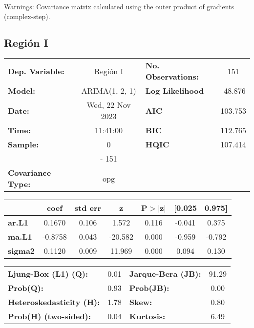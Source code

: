 \documentclass{article}%
\begin{document}
Warnings: \newline
 [1] Covariance matrix calculated using the outer product of gradients (complex-step).%
\subsection*{Región I}%
\begin{center}
\begin{tabular}{lclc}
\toprule
\textbf{Dep. Variable:}          &     Región I     & \textbf{  No. Observations:  } &    151      \\
\textbf{Model:}                  &  ARIMA(1, 2, 1)  & \textbf{  Log Likelihood     } &  -48.876    \\
\textbf{Date:}                   & Wed, 22 Nov 2023 & \textbf{  AIC                } &  103.753    \\
\textbf{Time:}                   &     11:41:00     & \textbf{  BIC                } &  112.765    \\
\textbf{Sample:}                 &        0         & \textbf{  HQIC               } &  107.414    \\
\textbf{}                        &       - 151      & \textbf{                     } &             \\
\textbf{Covariance Type:}        &       opg        & \textbf{                     } &             \\
\bottomrule
\end{tabular}
\begin{tabular}{lcccccc}
                & \textbf{coef} & \textbf{std err} & \textbf{z} & \textbf{P$> |$z$|$} & \textbf{[0.025} & \textbf{0.975]}  \\
\midrule
\textbf{ar.L1}  &       0.1670  &        0.106     &     1.572  &         0.116        &       -0.041    &        0.375     \\
\textbf{ma.L1}  &      -0.8758  &        0.043     &   -20.582  &         0.000        &       -0.959    &       -0.792     \\
\textbf{sigma2} &       0.1120  &        0.009     &    11.969  &         0.000        &        0.094    &        0.130     \\
\bottomrule
\end{tabular}
\begin{tabular}{lclc}
\textbf{Ljung-Box (L1) (Q):}     & 0.01 & \textbf{  Jarque-Bera (JB):  } & 91.29  \\
\textbf{Prob(Q):}                & 0.93 & \textbf{  Prob(JB):          } &  0.00  \\
\textbf{Heteroskedasticity (H):} & 1.78 & \textbf{  Skew:              } &  0.80  \\
\textbf{Prob(H) (two-sided):}    & 0.04 & \textbf{  Kurtosis:          } &  6.49  \\
\bottomrule
\end{tabular}
\end{center}
\end{document}
